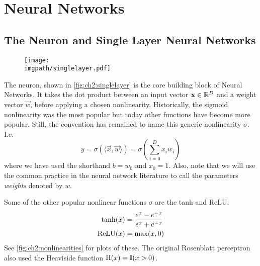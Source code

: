 \section{Neural Networks}\label{sec:ch2:nns}
\subsection{The Neuron and Single Layer Neural Networks}

\begin{figure}
  \centering
  \texttt{[image: \\imgpath/singlelayer.pdf]}
  \label{fig:ch2:singlelayer}
\end{figure}

The neuron, shown in \autoref{fig:ch2:singlelayer} is the core building block of
Neural Networks. It takes the dot product between an input vector $\vec{x} \in
\reals[D]$ and a weight vector $\vec{w}$, before applying a chosen nonlinearity.
Historically, the sigmoid nonlinearity was the most popular but today other
functions have become more popular. Still, the convention has remained to name this
generic nonlinearity $\sigma$. I.e.
%
\begin{equation}
  y = \sigma(\langle\vec{x}, \vec{w}\rangle) = \sigma\left(\sum_{i=0}^{D} x_i w_i \right)
\end{equation}
%
where we have used the shorthand $b=w_0$ and $x_0 = 1$. Also, note that we will
use the common practice in the neural network literature to call the parameters
\emph{weights} denoted by $w$.

Some of the other popular nonlinear functions $\sigma$ are
the tanh and ReLU:
\begin{align}
  \F{tanh}(x) &= \frac{e^{x} - e^{-x}}{e^{x} + e^{-x}} \label{eq:ch2:tanh}\\
  \F{ReLU}(x) &= \max (x, 0) \label{eq:ch2:relu}
\end{align}
%
See \autoref{fig:ch2:nonlinearities} for plots of these. The original Rosenblatt
perceptron \cite{rosenblatt_perceptron:_1958} also used the Heaviside function
$\F{H}(x) = \mathbb{I}(x > 0)$. %

